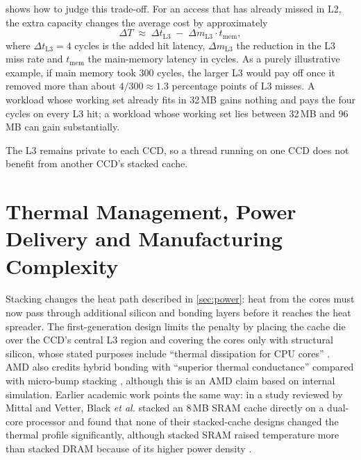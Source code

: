  shows how to judge this trade-off. For an access that has already missed in L2, the extra capacity changes the average cost by approximately
\begin{equation}
  \Delta T \;\approx\; \Delta t_{\mathrm{L3}} \;-\; \Delta m_{\mathrm{L3}} \cdot t_{\mathrm{mem}},
  \label{eq:vcache-tradeoff}
\end{equation}
where $\Delta t_{\mathrm{L3}} = 4$ cycles is the added hit latency, $\Delta m_{\mathrm{L3}}$ the reduction in the L3 miss rate and $t_{\mathrm{mem}}$ the main-memory latency in cycles. As a purely illustrative example, if main memory took 300 cycles, the larger L3 would pay off once it removed more than about $4/300 \approx 1.3$ percentage points of L3 misses. A workload whose working set already fits in 32\,MB gains nothing and pays the four cycles on every L3 hit; a workload whose working set lies between 32\,MB and 96\,MB can gain substantially. 

The L3 remains private to each CCD, so a thread running on one CCD does not benefit from another CCD's stacked cache.

\section{Thermal Management, Power Delivery and Manufacturing Complexity}
\label{sec:thermal}

Stacking changes the heat path described in \cref{sec:power}: heat from the cores must now pass through additional silicon and bonding layers before it reaches the heat spreader. The first-generation design limits the penalty by placing the cache die over the CCD's central L3 region \cite{amd2022epyc7003} and covering the cores only with structural silicon, whose stated purposes include ``thermal dissipation for CPU cores'' \cite[slide~12]{wuu2022vcache}. AMD also credits hybrid bonding with ``superior thermal conductance'' compared with micro-bump stacking \cite[slide~15]{wuu2022vcache}, although this is an AMD claim based on internal simulation. Earlier academic work points the same way: in a study reviewed by Mittal and Vetter, Black \emph{et al.} stacked an 8\,MB SRAM cache directly on a dual-core processor and found that none of their stacked-cache designs changed the thermal profile significantly, although stacked SRAM raised temperature more than stacked DRAM because of its higher power density \cite[p.~1853]{mittalSurveyTechniquesArchitecting2016}.

